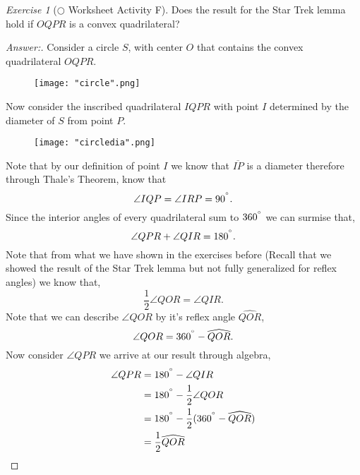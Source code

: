 \documentclass[12pt]{amsart}
\theoremstyle{remark}
\newtheorem*{exercise}{Exercise}%
\theoremstyle{mycomment}
\begin{document}
\thispagestyle{fancy}

\begin{exercise}[$\bigcirc$ Worksheet Activity F] Does the result for the Star Trek lemma hold if $OQPR$ is a convex quadrilateral?
\begin{proof}[Answer:] Consider a circle $S$, with center $O$ that contains the convex quadrilateral $OQPR$. 

\begin{figure}[H]
\caption{}
\centering
\texttt{[image: "circle".png]}
\end{figure}

Now consider the inscribed quadrilateral $IQPR$ with point $I$ determined by the diameter of $S$ from point $P$.

\begin{figure}[H]
\caption{}
\centering
\texttt{[image: "circledia".png]}
\end{figure}

 Note that by our definition of point $I$ we know that $\overline{IP}$ is a diameter therefore through Thale's Theorem, know that
\begin{equation}
\angle IQP = \angle IRP = 90^{\degree}.
\end{equation}
Since the interior angles of every quadrilateral sum to $360^{\degree}$ we can surmise that,
\begin{equation}
\angle QPR + \angle QIR = 180^{\degree}.
\end{equation}
Note that from what we have shown in the exercises before (Recall that we showed the result of the Star Trek lemma but not fully generalized for reflex angles) we know that,
\begin{equation}
\frac{1}{2} \angle QOR = \angle QIR.
\end{equation} 
Note that we can describe $\angle QOR$ by it's reflex angle $\widehat{QOR}$,
\begin{equation}
 \angle QOR = 360^{\degree} -\widehat{QOR}.
\end{equation}
Now consider $\angle QPR$ we arrive at our result through algebra,
\begin{align*}
\angle QPR &= 180^{\degree} - \angle QIR\\
&= 180^{\degree} - \frac{1}{2} \angle QOR \\
&= 180^{\degree} - \frac{1}{2} (360^{\degree} - \widehat{QOR})\\ 
&= \frac{1}{2} \widehat{QOR}
\end{align*}

\end{proof}
\end{exercise}
\end{document}
